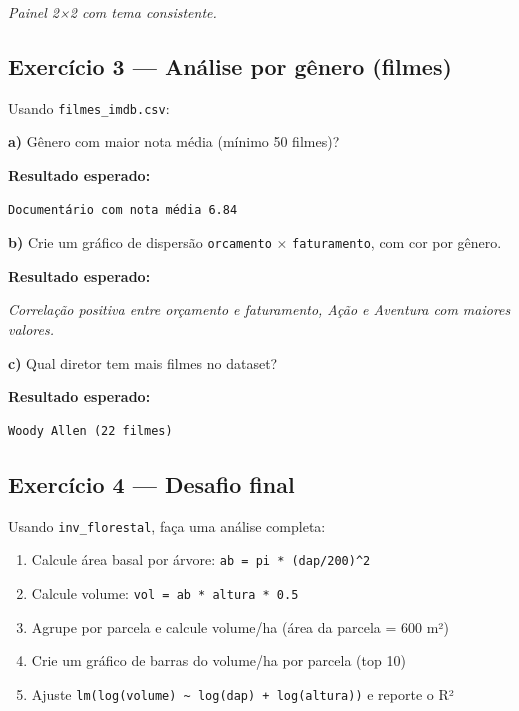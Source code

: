 \documentclass[
  letterpaper,
]{scrbook}
\providecommand{\tightlist}{%
  \setlength{\itemsep}{0pt}\setlength{\parskip}{0pt}}
\begin{document}
\emph{Painel 2×2 com tema consistente.}

\subsection{Exercício 3 --- Análise por gênero
(filmes)}\label{exercuxedcio-3-anuxe1lise-por-guxeanero-filmes}

Usando \texttt{filmes\_imdb.csv}:

\textbf{a)} Gênero com maior nota média (mínimo 50 filmes)?

\textbf{Resultado esperado:}

\begin{verbatim}
Documentário com nota média 6.84
\end{verbatim}

\textbf{b)} Crie um gráfico de dispersão \texttt{orcamento} ×
\texttt{faturamento}, com cor por gênero.

\textbf{Resultado esperado:}

\emph{Correlação positiva entre orçamento e faturamento, Ação e Aventura
com maiores valores.}

\textbf{c)} Qual diretor tem mais filmes no dataset?

\textbf{Resultado esperado:}

\begin{verbatim}
Woody Allen (22 filmes)
\end{verbatim}

\subsection{Exercício 4 --- Desafio
final}\label{exercuxedcio-4-desafio-final}

Usando \texttt{inv\_florestal}, faça uma análise completa:

\begin{enumerate}
\def\labelenumi{\arabic{enumi}.}
\tightlist
\item
  Calcule área basal por árvore: \texttt{ab\ =\ pi\ *\ (dap/200)\^{}2}
\item
  Calcule volume: \texttt{vol\ =\ ab\ *\ altura\ *\ 0.5}
\item
  Agrupe por parcela e calcule volume/ha (área da parcela = 600 m²)
\item
  Crie um gráfico de barras do volume/ha por parcela (top 10)
\item
  Ajuste
  \texttt{lm(log(volume)\ \textasciitilde{}\ log(dap)\ +\ log(altura))}
  e reporte o R²
\end{enumerate}
\end{document}
